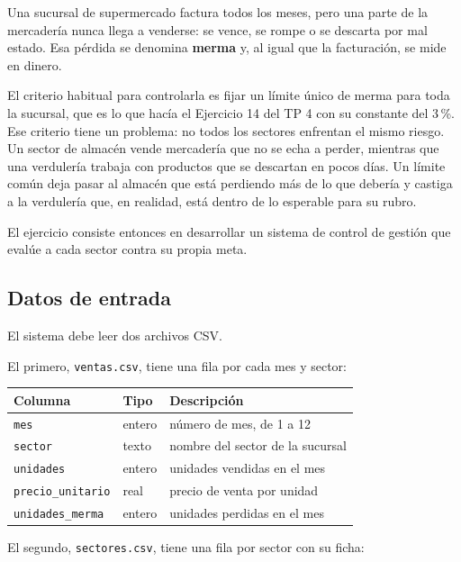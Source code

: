 \documentclass[12pt]{article}
\newcommand{\codigo}[1]{\texttt{\small #1}}
\begin{document}
Una sucursal de supermercado factura todos los meses, pero una parte de la mercadería nunca llega a venderse: se vence, se rompe o se descarta por mal estado. Esa pérdida se denomina \textbf{merma} y, al igual que la facturación, se mide en dinero.

El criterio habitual para controlarla es fijar un límite único de merma para toda la sucursal, que es lo que hacía el Ejercicio 14 del TP 4 con su constante del 3\,\%. Ese criterio tiene un problema: no todos los sectores enfrentan el mismo riesgo. Un sector de almacén vende mercadería que no se echa a perder, mientras que una verdulería trabaja con productos que se descartan en pocos días. Un límite común deja pasar al almacén que está perdiendo más de lo que debería y castiga a la verdulería que, en realidad, está dentro de lo esperable para su rubro.

El ejercicio consiste entonces en desarrollar un sistema de control de gestión que evalúe a cada sector contra su propia meta.

\subsection{Datos de entrada}

El sistema debe leer dos archivos CSV.

El primero, \codigo{ventas.csv}, tiene una fila por cada mes y sector:

\begin{center}
\begin{tabular}{lll}
    \toprule
    \textbf{Columna} & \textbf{Tipo} & \textbf{Descripción} \\
    \midrule
    \codigo{mes}              & entero & número de mes, de 1 a 12 \\
    \codigo{sector}           & texto  & nombre del sector de la sucursal \\
    \codigo{unidades}         & entero & unidades vendidas en el mes \\
    \codigo{precio\_unitario} & real   & precio de venta por unidad \\
    \codigo{unidades\_merma}  & entero & unidades perdidas en el mes \\
    \bottomrule
\end{tabular}
\end{center}

El segundo, \codigo{sectores.csv}, tiene una fila por sector con su ficha:
\end{document}
